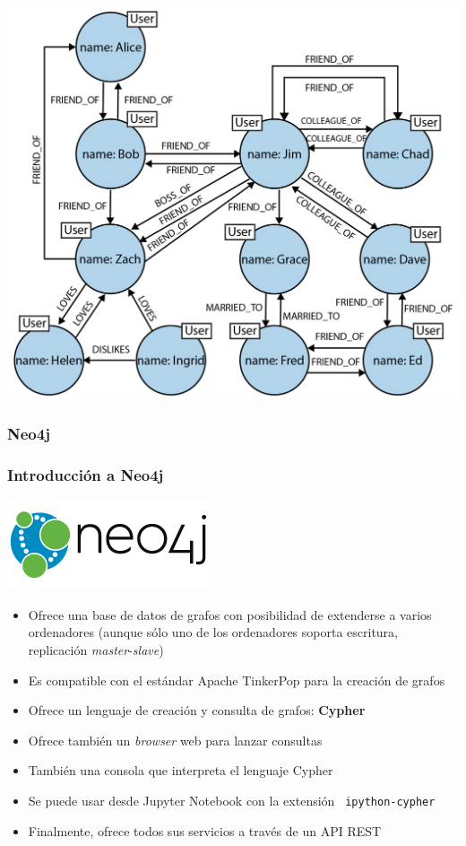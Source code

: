 \documentclass[14pt]{beamer}
\begin{document}
\begin{frame}
\begin{itemize}
\begin{frame}
\begin{center}
  \includegraphics[width=.78\textwidth]{img/graph3}
\end{center}
\end{frame}

\subsubsection{Neo4j}

\begin{frame}[allowframebreaks]
  \frametitle{Introducción a Neo4j}
\centering\includegraphics[width=.4\textwidth]{img/neo4j-logo-2015}
  \begin{itemize}
\item Ofrece una base de datos de grafos con posibilidad de extenderse a
  varios ordenadores (aunque sólo uno de los ordenadores soporta escritura,
  replicación {\em master}-{\em slave})
\item Es compatible con el estándar Apache TinkerPop para la creación de
  grafos
\item Ofrece un lenguaje de creación y consulta de grafos: {\bf Cypher}
\item Ofrece también un {\em browser\/} web para lanzar consultas
\item También una consola que interpreta el lenguaje Cypher
\item Se puede usar desde Jupyter Notebook con la extensión {\tt
    ipython-cypher}
\item Finalmente, ofrece todos sus servicios a través de un API REST
  \end{itemize}
\end{frame}


\end{itemize}
\end{frame}
\end{document}
